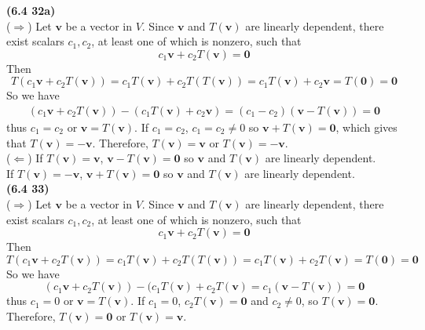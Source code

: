 \textbf{(6.4 32a)} \\
($\Rightarrow$) Let $\textbf{v}$ be a vector in $V$. Since $\textbf{v}$ and $T(\textbf{v})$ are linearly dependent, there exist scalars $c_1, c_2$, at least one of which is nonzero, such that \begin{equation*}
	c_1\textbf{v} + c_2T(\textbf{v}) = \textbf{0}
\end{equation*} Then \begin{equation*}
	T(c_1\textbf{v} + c_2T(\textbf{v})) = c_1T(\textbf{v}) + c_2T(T(\textbf{v})) = c_1T(\textbf{v}) + c_2\textbf{v} = T(\textbf{0}) = \textbf{0}
\end{equation*} So we have \begin{align*}
	(c_1\textbf{v} + c_2T(\textbf{v})) - (c_1T(\textbf{v}) + c_2\textbf{v}) = (c_1 - c_2)(\textbf{v} - T(\textbf{v})) =\textbf{0}
\end{align*} thus $c_1 = c_2$ or $\textbf{v} = T(\textbf{v})$. If $c_1 = c_2$, $c_1 = c_2 \neq 0$ so $\textbf{v} + T(\textbf{v}) = \textbf{0}$, which gives that $T(\textbf{v}) = -\textbf{v}$. Therefore, $T(\textbf{v}) = \textbf{v}$ or $T(\textbf{v}) = -\textbf{v}$. \\

($\Leftarrow$) If $T(\textbf{v}) = \textbf{v}$, $\textbf{v} - T(\textbf{v}) = \textbf{0}$ so $\textbf{v}$ and $T(\textbf{v})$ are linearly dependent. \\

If $T(\textbf{v}) = -\textbf{v}$, $\textbf{v} + T(\textbf{v}) = \textbf{0}$ so $\textbf{v}$ and $T(\textbf{v})$ are linearly dependent. \\

\textbf{(6.4 33)} \\
($\Rightarrow$) Let $\textbf{v}$ be a vector in $V$. Since $\textbf{v}$ and $T(\textbf{v})$ are linearly dependent, there exist scalars $c_1, c_2$, at least one of which is nonzero, such that \begin{equation*}
	c_1\textbf{v} + c_2T(\textbf{v}) = \textbf{0}
\end{equation*} Then \begin{equation*}
	T(c_1\textbf{v} + c_2T(\textbf{v})) = c_1T(\textbf{v}) + c_2T(T(\textbf{v})) = c_1T(\textbf{v}) + c_2T(\textbf{v}) = T(\textbf{0}) = \textbf{0}
\end{equation*} So we have \begin{equation*}
	(c_1\textbf{v} + c_2T(\textbf{v})) - (c_1T(\textbf{v}) + c_2T(\textbf{v}) = c_1(\textbf{v} - T(\textbf{v})) = \textbf{0}
\end{equation*} thus $c_1 = 0$ or $\textbf{v} = T(\textbf{v})$. If $c_1 = 0$, $c_2T(\textbf{v}) = \textbf{0}$ and $c_2 \neq 0$, so $T(\textbf{v}) = \textbf{0}$. Therefore, $T(\textbf{v}) = \textbf{0}$ or $T(\textbf{v}) = \textbf{v}$. \\

